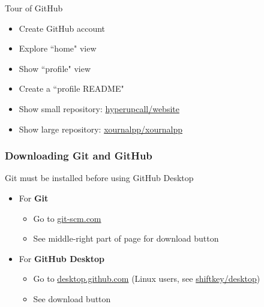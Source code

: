 \documentclass{beamer}
\begin{document}
\begin{frame}{Tour of GitHub}
	\begin{itemize}
		\item Create GitHub account
		\item Explore ``home" view
		\item Show ``profile" view
		\item Create a ``profile README"
		\item Show small repository: \href{https://github.com/hyperupcall/website}{hyperupcall/website}
		\item Show large repository: \href{https://github.com/xournalpp/xournalpp}{xournalpp/xournalpp}
	\end{itemize}

\end{frame}


\begin{frame}
	\frametitle{Downloading Git and GitHub}

	Git must be installed before using GitHub Desktop
	\newline

	\begin{itemize}
		\item For \textbf{Git}
			\begin{itemize}
				\item Go to \href{https://git-scm.com/}{git-scm.com}
				\item See middle-right part of page for download button
			\end{itemize}
		\item For \textbf{GitHub Desktop}
			\begin{itemize}
				\item Go to \href{https://desktop.github.com}{desktop.github.com} (Linux users, see \href{https://github.com/shiftkey/desktop/releases}{shiftkey/desktop})
				\item See download button
			\end{itemize}
	\end{itemize}
\end{frame}
\end{document}
